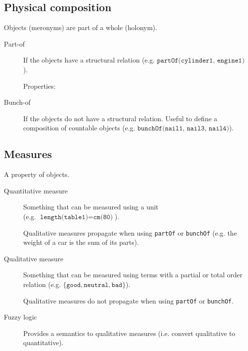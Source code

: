 \subsection{Physical composition}
Objects (meronyms) are part of a whole (holonym).

\begin{description}
    \item[Part-of] 
        If the objects have a structural relation (e.g. $\texttt{partOf(cylinder1, engine1)}$).

        Properties:

    \item[Bunch-of] 
        If the objects do not have a structural relation.
        Useful to define a composition of countable objects
        (e.g. $\texttt{bunchOf({nail1, nail3, nail4})}$).
\end{description}


\subsection{Measures}

A property of objects.

\begin{description}
    \item[Quantitative measure] 
        Something that can be measured using a unit\\
        (e.g. $\texttt{length(table1)} = \texttt{cm(80)}$).

        Qualitative measures propagate when using \texttt{partOf} or \texttt{bunchOf} 
        (e.g. the weight of a car is the sum of its parts).

    \item[Qualitative measure] 
        Something that can be measured using terms with a partial or total order relation
        (e.g. $\{ \texttt{good}, \texttt{neutral}, \texttt{bad} \}$).

        Qualitative measures do not propagate when using \texttt{partOf} or \texttt{bunchOf}.

    \item[Fuzzy logic] 
        Provides a semantics to qualitative measures (i.e. convert qualitative to quantitative).
\end{description}



